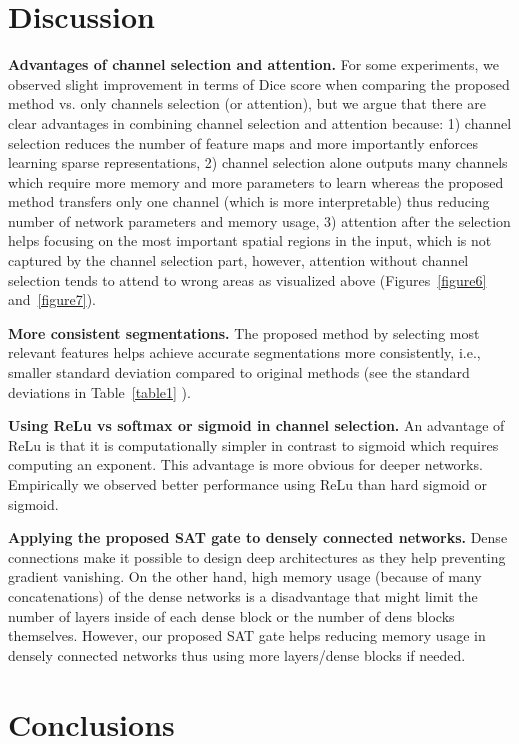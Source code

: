 \documentclass{article}
\begin{document}
\section{Discussion}
\label{sec:blind}
\textbf{Advantages of channel selection and attention.} For some experiments, we observed slight improvement in terms of Dice score when comparing the proposed method vs. only channels selection (or attention), but we argue that there are clear advantages in combining channel selection and attention because: 1) channel selection reduces the number of feature maps and more importantly enforces learning sparse representations, 2) channel selection alone outputs many channels which require more memory and more parameters to learn whereas the proposed method transfers only one channel (which is more interpretable) thus reducing number of network parameters and memory usage, 3) attention after the selection helps focusing on the most important spatial regions in the input, which is not captured by the channel selection part, however, attention without channel selection tends to attend to wrong areas as visualized above (Figures~\ref{figure6} and~\ref{figure7}).

\noindent \textbf{More consistent segmentations.} The proposed method by selecting most relevant features helps achieve accurate segmentations more consistently, i.e., smaller standard deviation compared to original methods (see the standard deviations in Table~\ref{table1} ).

\noindent \textbf{Using ReLu vs softmax or sigmoid in channel selection.} An advantage of ReLu is that it is computationally simpler in contrast to sigmoid which requires computing an exponent. This advantage is more obvious for deeper networks. Empirically we observed better performance using ReLu than hard sigmoid or sigmoid.


\noindent \textbf{Applying the proposed SAT gate to densely connected networks.} Dense connections make it possible to design deep architectures as they help preventing gradient vanishing. On the other hand, high memory usage (because of many concatenations) of the dense networks is a disadvantage that might limit the number of layers inside of each dense block or the number of dens blocks themselves. However, our proposed SAT gate helps reducing memory usage in densely connected networks thus using more layers/dense blocks if needed.


\section{Conclusions}
\end{document}
